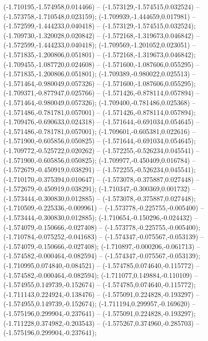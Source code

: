  (-1.710195,-1.574958,0.014466) -- (-1.573129,-1.574515,0.032524) -- (-1.573758,-1.710548,0.023159);
 (-1.709939,-1.444659,0.017981) -- (-1.572599,-1.444233,0.040418) -- (-1.573129,-1.574515,0.032524);
 (-1.709730,-1.320028,0.020842) -- (-1.572168,-1.319673,0.046842) -- (-1.572599,-1.444233,0.040418);
 (-1.709569,-1.201052,0.023051) -- (-1.571835,-1.200806,0.051801) -- (-1.572168,-1.319673,0.046842);
 (-1.709455,-1.087720,0.024608) -- (-1.571600,-1.087606,0.055295) -- (-1.571835,-1.200806,0.051801);
 (-1.709389,-0.980022,0.025513) -- (-1.571464,-0.980049,0.057326) -- (-1.571600,-1.087606,0.055295);
 (-1.709371,-0.877947,0.025766) -- (-1.571426,-0.878114,0.057894) -- (-1.571464,-0.980049,0.057326);
 (-1.709400,-0.781486,0.025368) -- (-1.571486,-0.781781,0.057001) -- (-1.571426,-0.878114,0.057894);
 (-1.709476,-0.690633,0.024318) -- (-1.571644,-0.691034,0.054645) -- (-1.571486,-0.781781,0.057001);
 (-1.709601,-0.605381,0.022616) -- (-1.571900,-0.605856,0.050825) -- (-1.571644,-0.691034,0.054645);
 (-1.709772,-0.525722,0.020262) -- (-1.572255,-0.526234,0.045541) -- (-1.571900,-0.605856,0.050825);
 (-1.709977,-0.450409,0.016784) -- (-1.572679,-0.450919,0.038291) -- (-1.572255,-0.526234,0.045541);
 (-1.710170,-0.375394,0.010647) -- (-1.573078,-0.375887,0.027448) -- (-1.572679,-0.450919,0.038291);
 (-1.710347,-0.300369,0.001732) -- (-1.573444,-0.300830,0.012885) -- (-1.573078,-0.375887,0.027448);
 (-1.710509,-0.225336,-0.009961) -- (-1.573778,-0.225755,-0.005400) -- (-1.573444,-0.300830,0.012885);
 (-1.710654,-0.150296,-0.024432) -- (-1.574079,-0.150666,-0.027408) -- (-1.573778,-0.225755,-0.005400);
 (-1.710784,-0.075252,-0.041683) -- (-1.574347,-0.075567,-0.053139) -- (-1.574079,-0.150666,-0.027408);
 (-1.710897,-0.000206,-0.061713) -- (-1.574582,-0.000464,-0.082594) -- (-1.574347,-0.075567,-0.053139);
 (-1.710995,0.074840,-0.084521) -- (-1.574785,0.074640,-0.115772) -- (-1.574582,-0.000464,-0.082594);
 (-1.711077,0.149884,-0.110109) -- (-1.574955,0.149739,-0.152674) -- (-1.574785,0.074640,-0.115772);
 (-1.711143,0.224924,-0.138476) -- (-1.575091,0.224828,-0.193297) -- (-1.574955,0.149739,-0.152674);
 (-1.711194,0.299957,-0.169620) -- (-1.575196,0.299904,-0.237641) -- (-1.575091,0.224828,-0.193297);
 (-1.711228,0.374982,-0.203543) -- (-1.575267,0.374960,-0.285703) -- (-1.575196,0.299904,-0.237641);
